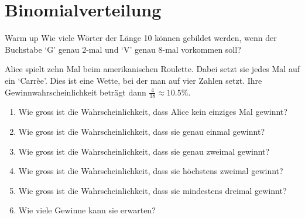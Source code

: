 \section{Binomialverteilung}

\begin{bsp}
    {Warm up}{}
    Wie viele Wörter der Länge 10 können gebildet werden, wenn der Buchstabe `G' genau 2-mal und `V' genau 8-mal vorkommen soll?

    \vspace*{5cm}
\end{bsp}


\begin{LA}
    {}{}
    Alice spielt zehn Mal beim amerikanischen Roulette. Dabei setzt sie jedes Mal auf ein `Carrèe'. Dies ist eine Wette, bei der man auf vier Zahlen setzt. Ihre Gewinnwahrscheinlichkeit beträgt dann \(\frac{4}{38} \approx 10.5\%\).
    \begin{enumerate}
        \item Wie gross ist die Wahrscheinlichkeit, dass Alice kein einziges Mal gewinnt?
        \item Wie gross ist die Wahrscheinlichkeit, dass sie genau einmal gewinnt?
        \item Wie gross ist die Wahrscheinlichkeit, dass sie genau zweimal gewinnt?
        \item Wie gross ist die Wahrscheinlichkeit, dass sie höchstens zweimal gewinnt?
        \item Wie gross ist die Wahrscheinlichkeit, dass sie mindestens dreimal gewinnt?
        \item Wie viele Gewinne kann sie erwarten?
    \end{enumerate}
\end{LA}

\clearpage
